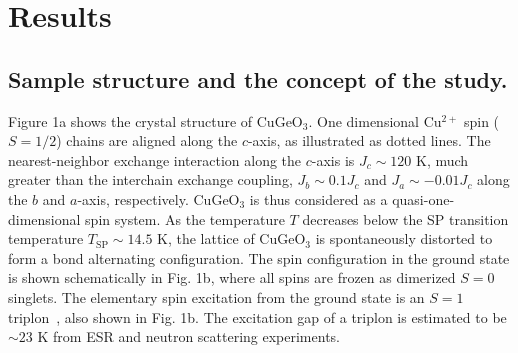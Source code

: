 \documentclass{nature}
\begin{document}
\par 
\section*{Results}

\subsection{Sample structure and the concept of the study.} 
Figure 1a shows the crystal structure of CuGeO$_3$. 
One dimensional Cu$^{2+}$ spin ($S=1/2$) chains are aligned along the $c$-axis, as illustrated as dotted lines. 
The nearest-neighbor exchange interaction along the $c$-axis is $J_c \sim 120 $ K, much greater than the interchain exchange coupling\cite{Nishi:1994da}, $J_b\sim 0.1 J_c$ and $J_a\sim -0.01 J_c$ along the $b$ and $a$-axis, respectively. 
CuGeO$_3$ is thus considered as a quasi-one-dimensional spin system.
  As the temperature $T$ decreases below the SP transition temperature  $T_{\mathrm{SP}} \sim  14.5$ K, the lattice of CuGeO$_3$ is spontaneously distorted to form a bond alternating configuration\cite{Lorenzo:1994bt}.
  The spin configuration in the ground state is shown schematically in Fig. 1b, where all spins are frozen as dimerized $S=0$ singlets.
The elementary spin excitation from the ground state is an $S=1$ triplon~\cite{Takayoshi:2010fi}, also shown in Fig. 1b. 
  The excitation gap of a triplon is estimated to be $\sim 23$ K from ESR\cite{Brill:1994ki} and neutron scattering\cite{Regnault:1996bv,Fujita:1995ha,Nishi:1994da} experiments.



\par 
\end{document}
